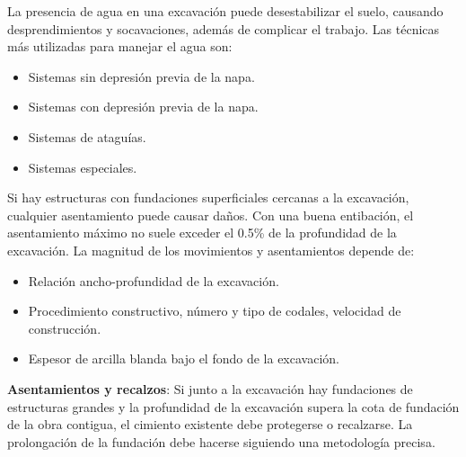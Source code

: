 La presencia de agua en una excavación puede desestabilizar el suelo, causando desprendimientos y socavaciones, además de complicar el trabajo. Las técnicas más utilizadas para manejar el agua son:
\begin{itemize}
    \item Sistemas sin depresión previa de la napa.
    \item Sistemas con depresión previa de la napa.
    \item Sistemas de ataguías.
    \item Sistemas especiales.
\end{itemize}

Si hay estructuras con fundaciones superficiales cercanas a la excavación, cualquier asentamiento puede causar daños. Con una buena entibación, el asentamiento máximo no suele exceder el 0.5\% de la profundidad de la excavación. La magnitud de los movimientos y asentamientos depende de:
\begin{itemize}
    \item Relación ancho-profundidad de la excavación.
    \item Procedimiento constructivo, número y tipo de codales, velocidad de construcción.
    \item Espesor de arcilla blanda bajo el fondo de la excavación.
\end{itemize}

\textbf{Asentamientos y recalzos}: Si junto a la excavación hay fundaciones de estructuras grandes y la profundidad de la excavación supera la cota de fundación de la obra contigua, el cimiento existente debe protegerse o recalzarse. La prolongación de la fundación debe hacerse siguiendo una metodología precisa.
